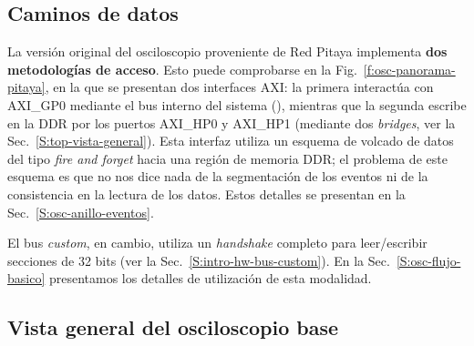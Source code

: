 \subsection{Caminos de datos}
\label{S:osc-caminos}

La versión original del osciloscopio proveniente de Red Pitaya implementa
\textbf{dos metodologías de acceso}. Esto puede comprobarse en la
Fig.~\ref{f:osc-panorama-pitaya}, en la que se presentan dos interfaces AXI: la
primera interactúa con AXI\_GP0 mediante el bus interno del sistema
(), mientras que la segunda escribe en la DDR por los puertos
AXI\_HP0 y AXI\_HP1 (mediante dos \emph{bridges}, ver la
Sec.~\ref{S:top-vista-general}). Esta interfaz utiliza un esquema de volcado de
datos del tipo \emph{fire and forget} hacia una región de memoria DDR; el
problema de este esquema es que no nos dice nada de la segmentación de los
eventos ni de la consistencia en la lectura de los datos. Estos detalles se
presentan en la Sec.~\ref{S:osc-anillo-eventos}.

El bus \emph{custom}, en cambio, utiliza un \emph{handshake} completo para leer/escribir
secciones de 32 bits (ver la Sec.~\ref{S:intro-hw-bus-custom}). En la
Sec.~\ref{S:osc-flujo-basico} presentamos los detalles de utilización de esta
modalidad.

\subsection{Vista general del osciloscopio base}
\label{S:osc-vista-general}


